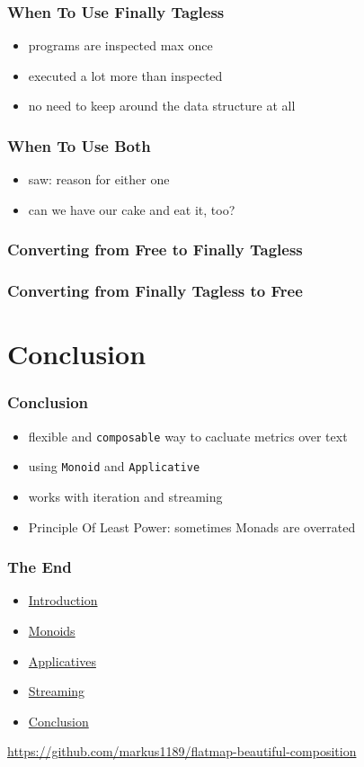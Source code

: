 \documentclass[aspectratio=169]{beamer}
\begin{document}
\begin{frame}
  \frametitle{When To Use Finally Tagless}
  \begin{itemize}
  \item programs are inspected max once
  \item executed a lot more than inspected
  \item no need to keep around the data structure at all
  \end{itemize}
\end{frame}

\begin{frame}
  \frametitle{When To Use Both}
  \begin{itemize}
  \item saw: reason for either one
  \item can we have our cake and eat it, too?
  \end{itemize}
\end{frame}

\begin{frame}
  \frametitle{Converting from Free to Finally Tagless}
\end{frame}

\begin{frame}
  \frametitle{Converting from Finally Tagless to Free}
\end{frame}

\section{Conclusion}\label{sec:conclusion}

\begin{frame}
  \frametitle{Conclusion}
  \begin{itemize}
  \item flexible and \texttt{composable} way to cacluate metrics over text
  \item using \texttt{Monoid} and \texttt{Applicative}
  \item works with iteration and streaming
  \item Principle Of Least Power: sometimes Monads are overrated
  \end{itemize}
\end{frame}

\begin{frame}
  \frametitle{The End}
  \begin{itemize}
  \item \hyperref[sec:introduction]{Introduction}
  \item \hyperref[sec:monoids]{Monoids}
  \item \hyperref[sec:applicatives]{Applicatives}
  \item \hyperref[sec:streaming]{Streaming}
  \item \hyperref[sec:conclusion]{Conclusion}
  \end{itemize}
  \vfill
  \begin{center}
    \url{https://github.com/markus1189/flatmap-beautiful-composition}
  \end{center}
\end{frame}

\appendix{}
\end{document}
